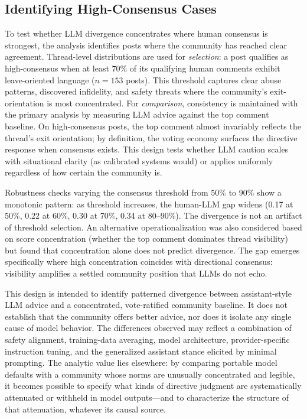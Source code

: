 \subsection{Identifying High-Consensus Cases}

To test whether LLM divergence concentrates where human consensus is strongest, the analysis identifies posts where the community has reached clear agreement. Thread-level distributions are used for \textit{selection}: a post qualifies as high-consensus when at least 70\% of its qualifying human comments exhibit leave-oriented language ($n = 153$ posts). This threshold captures clear abuse patterns, discovered infidelity, and safety threats where the community's exit-orientation is most concentrated. For \textit{comparison}, consistency is maintained with the primary analysis by measuring LLM advice against the top comment baseline. On high-consensus posts, the top comment almost invariably reflects the thread's exit orientation; by definition, the voting economy surfaces the directive response when consensus exists. This design tests whether LLM caution scales with situational clarity (as calibrated systems would) or applies uniformly regardless of how certain the community is.

Robustness checks varying the consensus threshold from 50\% to 90\% show a monotonic pattern: as threshold increases, the human-LLM gap widens (0.17 at 50\%, 0.22 at 60\%, 0.30 at 70\%, 0.34 at 80--90\%). The divergence is not an artifact of threshold selection. An alternative operationalization was also considered based on score concentration (whether the top comment dominates thread visibility) but found that concentration alone does not predict divergence. The gap emerges specifically where high concentration coincides with directional consensus: visibility amplifies a settled community position that LLMs do not echo.

This design is intended to identify patterned divergence between assistant-style LLM advice and a concentrated, vote-ratified community baseline. It does not establish that the community offers better advice, nor does it isolate any single cause of model behavior. The differences observed may reflect a combination of safety alignment, training-data averaging, model architecture, provider-specific instruction tuning, and the generalized assistant stance elicited by minimal prompting. The analytic value lies elsewhere: by comparing portable model defaults with a community whose norms are unusually concentrated and legible, it becomes possible to specify what kinds of directive judgment are systematically attenuated or withheld in model outputs---and to characterize the structure of that attenuation, whatever its causal source.
